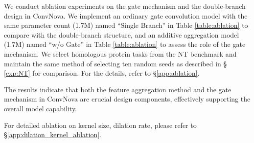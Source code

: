 We conduct ablation experiments on the gate mechanism and the double-branch design in ConvNova. We implement an ordinary gate convolution model with the same parameter count (1.7M) named ``Single Branch'' in Table \ref{table:ablation} to compare with the double-branch structure, and an additive aggregation model (1.7M) named ``w/o Gate'' in Table \ref{table:ablation} to assess the role of the gate mechanism. We select homologous protein tasks from the NT benchmark and maintain the same method of selecting ten random seeds as described in 
\S 
\ref{exp:NT} for comparison. For the details, refer to \S \ref{app:ablation}.

The results indicate that both the feature aggregation method and the gate mechanism in ConvNova are crucial design components, effectively supporting the overall model capability.

For detailed ablation on kernel size, dilation rate, please refer to \S \ref{app:dilation_kernel_ablation}.